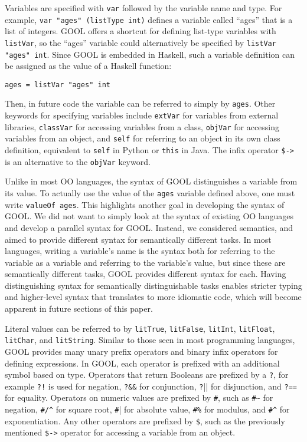 \documentclass[sigplan,review,anonymous]{acmart}
\begin{document}
Variables are specified with \verb|var| followed by the variable name and type. 
For example, \verb|var "ages" (listType int)| defines a variable called 
``ages'' that is a list of integers. GOOL offers a shortcut for defining 
list-type variables with \verb|listVar|, so the ``ages'' variable could 
alternatively be specified by \verb|listVar "ages" int|. Since GOOL is embedded 
in Haskell, such a variable definition can be assigned as the value of a 
Haskell function:
\begin{lstlisting}
ages = listVar "ages" int
\end{lstlisting}
Then, in future code the variable can be referred to simply by \verb|ages|. 
Other keywords for specifying variables include \verb|extVar| for variables 
from external libraries, \verb|classVar| for accessing variables from a class, 
\verb|objVar| for accessing variables from an object, and \verb|self| for 
referring to an object in its own class definition, equivalent to \verb|self| 
in Python or \verb|this| in Java. The infix operator \verb|$->| is an 
alternative to the \verb|objVar| keyword.

Unlike in most OO languages, the syntax of GOOL distinguishes a variable from 
its value. To actually use the value of the \verb|ages| variable defined above, 
one must write \verb|valueOf ages|. This highlights another goal in developing 
the syntax of GOOL. We did not want to simply look at the syntax of existing OO 
languages and develop a parallel syntax for GOOL. Instead, we considered 
semantics, and aimed to provide different syntax for semantically different 
tasks. In most languages, writing a variable's name is the syntax both for 
referring to the variable as a variable and referring to the variable's value, 
but since these are semantically different tasks, GOOL provides different 
syntax for each. Having distinguishing syntax for semantically distinguishable 
tasks enables stricter typing and higher-level syntax that translates to more 
idiomatic code, which will become apparent in future sections of this paper.

Literal values can be referred to by \verb|litTrue|, \verb|litFalse|, 
\verb|litInt|, \verb|litFloat|, \verb|litChar|, and \verb|litString|. Similar 
to those seen in most programming languages, GOOL provides many unary prefix 
operators and binary infix operators for defining expressions. In GOOL, each 
operator is prefixed with an additional symbol based on type. Operators that 
return Booleans are prefixed by a \verb|?|, for example \verb|?!| is used for 
negation, \verb|?&&| for conjunction, \verb|?||| for disjunction, and
\verb|?==| for equality. Operators on numeric values are prefixed by \verb|#|, 
such as \verb|#~| for negation, \verb|#/^| for square root, \verb|#|| for 
absolute value, \verb|#%| for modulus, and \verb|#^| for exponentiation. Any 
other operators are prefixed by \verb|$|, such as the previously mentioned 
\verb|$->| operator for accessing a variable from an object.
\end{document}

